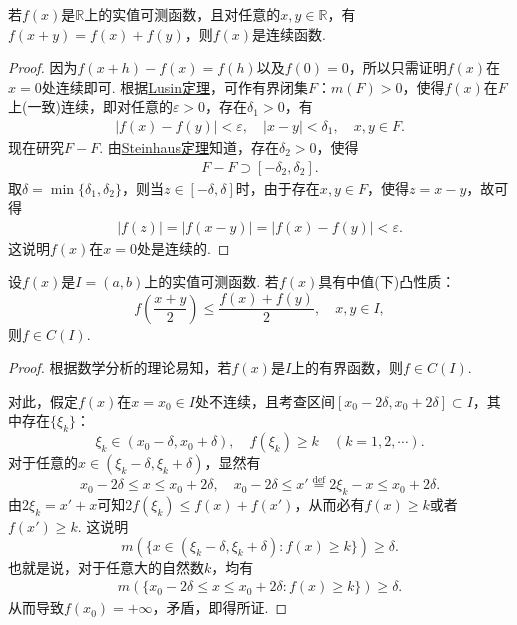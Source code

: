 \documentclass[../../main.tex]{subfiles}%
\begin{document}
\begin{example}
若\(f(x)\)是\(\mathbb{R}\)上的实值可测函数，且对任意的\(x, y \in \mathbb{R}\)，有\(f(x + y) = f(x) + f(y)\)，则\(f(x)\)是连续函数.
\end{example}
\begin{proof}
因为\(f(x + h) - f(x) = f(h)\)以及\(f(0) = 0\)，所以只需证明\(f(x)\)在\(x = 0\)处连续即可. 根据\hyperref[theorem:Lusin(卢津)定理]{Lusin定理}，可作有界闭集\(F\)：\(m(F)>0\)，使得\(f(x)\)在\(F\)上(一致)连续，即对任意的\(\varepsilon > 0\)，存在\(\delta_1 > 0\)，有
\begin{align*}
|f(x) - f(y)| < \varepsilon, \quad |x - y| < \delta_1, \quad x, y \in F.
\end{align*}
现在研究\(F - F\). 由\hyperref[theorem:Steinhaus定理]{Steinhaus定理}知道，存在\(\delta_2 > 0\)，使得
\begin{align*}
F - F \supset [-\delta_2, \delta_2].
\end{align*}
取\(\delta = \min\{\delta_1, \delta_2\}\)，则当\(z \in [-\delta, \delta]\)时，由于存在\(x, y \in F\)，使得\(z = x - y\)，故可得
\begin{align*}
|f(z)| = |f(x - y)| = |f(x) - f(y)| < \varepsilon.
\end{align*}
这说明\(f(x)\)在\(x = 0\)处是连续的.
\end{proof}

\begin{example}
设\(f(x)\)是\(I = (a, b)\)上的实值可测函数. 若\(f(x)\)具有中值(下)凸性质：
\[f\left(\frac{x + y}{2}\right) \leqslant \frac{f(x) + f(y)}{2}, \quad x, y \in I,\]
则\(f \in C(I)\).
\end{example}
\begin{proof}
根据数学分析的理论易知，若\(f(x)\)是\(I\)上的有界函数，则\(f \in C(I)\).

对此，假定\(f(x)\)在\(x = x_0 \in I\)处不连续，且考查区间\([x_0 - 2\delta, x_0 + 2\delta] \subset I\)，其中存在\(\{\xi_k\}\)：
\[\xi_k \in (x_0 - \delta, x_0 + \delta), \quad f(\xi_k) \geqslant k \quad (k = 1,2,\cdots).\]
对于任意的\(x \in (\xi_k - \delta, \xi_k + \delta)\)，显然有
\[x_0 - 2\delta \leqslant x \leqslant x_0 + 2\delta, \quad x_0 - 2\delta \leqslant x' \stackrel{\text{def}}{=} 2\xi_k - x \leqslant x_0 + 2\delta.\]
由\(2\xi_k = x' + x\)可知\(2f(\xi_k) \leqslant f(x) + f(x')\)，从而必有\(f(x) \geqslant k\)或者\(f(x') \geqslant k\).
这说明
\[m(\{x \in (\xi_k - \delta, \xi_k + \delta) : f(x) \geqslant k\}) \geqslant \delta.\]
也就是说，对于任意大的自然数\(k\)，均有
\begin{align*}
m(\{x_0 - 2\delta \leqslant x \leqslant x_0 + 2\delta : f(x) \geqslant k\}) \geqslant \delta.
\end{align*}
从而导致\(f(x_0) = +\infty\)，矛盾，即得所证. 
\end{proof}
\end{document}
